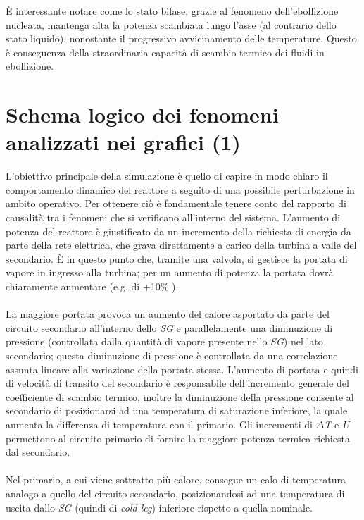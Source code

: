 \documentclass[12pt]{report}
\begin{document}
È interessante notare come lo stato bifase, grazie al fenomeno dell’ebollizione nucleata, mantenga alta la potenza scambiata lungo l’asse (al contrario dello stato liquido), nonostante il progressivo avvicinamento delle temperature. Questo è conseguenza della straordinaria capacità di scambio termico dei fluidi in ebollizione.

\section{Schema logico dei fenomeni analizzati nei grafici (1)}

L’obiettivo principale della simulazione è quello di capire in modo chiaro il comportamento dinamico del reattore a seguito di una possibile perturbazione in ambito operativo. 
Per ottenere ciò è fondamentale tenere conto del rapporto di causalità tra i fenomeni che si verificano all’interno del sistema.
L’aumento di potenza del reattore è giustificato da un incremento della richiesta di energia da parte della rete elettrica, che grava direttamente a carico della turbina a valle del secondario. È in questo punto che, tramite una valvola, si gestisce la portata di vapore in ingresso alla turbina; per un aumento di potenza la portata dovrà chiaramente aumentare (e.g. di +10\% ).\\ \\La maggiore portata provoca un aumento del calore asportato da parte del circuito secondario all’interno dello \textit{SG} e parallelamente una diminuzione di pressione (controllata dalla quantità di vapore presente nello \textit{SG}) nel lato secondario; questa diminuzione di pressione è controllata da una correlazione assunta lineare alla variazione della portata stessa.
L’aumento di portata e quindi di velocità di transito del secondario è responsabile dell’incremento generale del coefficiente di scambio termico, inoltre la diminuzione della pressione consente al secondario di posizionarsi ad una temperatura di saturazione inferiore, la quale aumenta la differenza di temperatura con il primario.
Gli incrementi di \textit{$\Delta$T} e \textit{U} permettono al circuito primario di fornire la maggiore potenza termica richiesta dal secondario.\\ \\ Nel primario, a cui viene sottratto più calore, consegue un calo di temperatura analogo a quello del circuito secondario, posizionandosi ad una temperatura di uscita dallo \textit{SG} (quindi di \textit{cold leg}) inferiore rispetto a quella nominale. 
\end{document}
